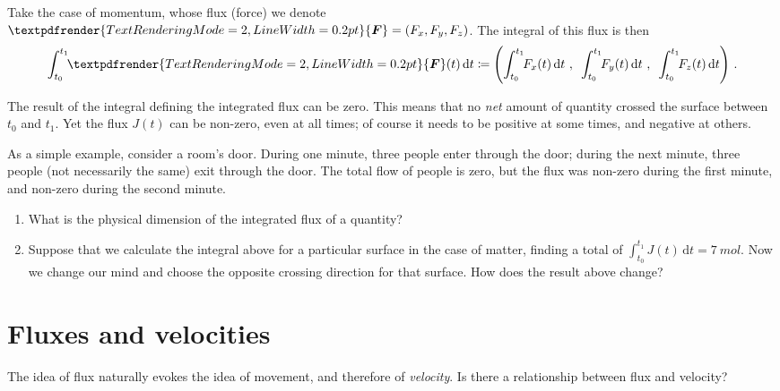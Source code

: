 \documentclass[a4paper,12pt,%
onecolumn,oneside,%
british%
]{memoir}
\renewcommand*{\bm}[1]{\textpdfrender{TextRenderingMode=2,LineWidth=0.2pt}{\boldsymbol{#1}}}
\newcommand*{\di}{\mathrm{d}}%
\newcommand*{\defd}{\coloneqq}
\renewcommand*{\|}[1][]{\nonscript\:#1\vert\nonscript\:\mathopen{}}
\newcommand*{\yti}{t_{0}}
\newcommand*{\ytf}{t_{1}}
\newcommand*{\yJ}{J}
\newcommand*{\yF}{\bm{F}}
\begin{document}
Take the case of momentum, whose flux (force) we denote $\yF=(F_{x}, F_{y}, F_{z})$. The integral of this flux is then
\begin{equation}
  \label{eq:total_flow_integral_vector}
  \int_{\yti}^{\ytf}\!\! \yF(t)\,\di t \defd
  \Biggl(
  \int_{\yti}^{\ytf}\!\! F_{x}(t)\,\di t \ ,\enspace
  \int_{\yti}^{\ytf}\!\! F_{y}(t)\,\di t \ ,\enspace
  \int_{\yti}^{\ytf}\!\! F_{z}(t)\,\di t
  \Biggr) \ .
\end{equation}

\medskip

\begin{warning}
  The result of the integral defining the integrated flux can be zero. This means that no \emph{net} amount of quantity crossed the surface between $\yti$ and $\ytf$. Yet the flux $\yJ(t)$ can be non-zero, even at all times; of course it needs to be positive at some times, and negative at others.
\end{warning}
As a simple example, consider a room's door. During one minute, three people enter through the door; during the next minute, three people (not necessarily the same) exit through the door. The total flow of people is zero, but the flux was non-zero during the first minute, and non-zero during the second minute.

\medskip

\begin{exercise}
  \begin{enumerate}[exerc]
  \item What is the physical dimension of the integrated flux of a quantity?
  \item Suppose that we calculate the integral above for a particular surface in the case of matter, finding a total of $\int_{\yti}^{\ytf}\!\! \yJ(t)\,\di t = \qty{7}{mol}$. Now we change our mind and choose the opposite crossing direction for that surface. How does the result above change?
  \end{enumerate}
\end{exercise}

\section{Fluxes and velocities}
\label{sec:fluxes_velocities}

The idea of flux naturally evokes the idea of movement, and therefore of \emph{velocity}. Is there a relationship between flux and velocity?
\end{document}
